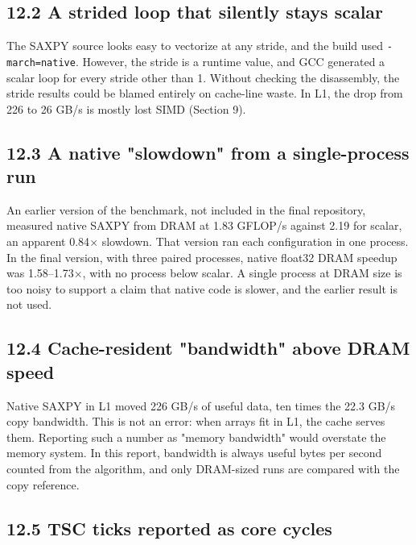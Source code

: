 \documentclass[10pt,letterpaper]{article}
\begin{document}
\subsection*{12.2 A strided loop that silently stays scalar}

The SAXPY source looks easy to vectorize at any stride, and the build used \texttt{-march=native}. However, the stride is a runtime value, and GCC generated a scalar loop for every stride other than 1. Without checking the disassembly, the stride results could be blamed entirely on cache-line waste. In L1, the drop from 226 to 26 GB/s is mostly lost SIMD (Section 9).


\subsection*{12.3 A native "slowdown" from a single-process run}

An earlier version of the benchmark, not included in the final repository, measured native SAXPY from DRAM at 1.83 GFLOP/s against 2.19 for scalar, an apparent 0.84$\times$ slowdown. That version ran each configuration in one process. In the final version, with three paired processes, native float32 DRAM speedup was 1.58--1.73$\times$, with no process below scalar. A single process at DRAM size is too noisy to support a claim that native code is slower, and the earlier result is not used.


\subsection*{12.4 Cache-resident "bandwidth" above DRAM speed}

Native SAXPY in L1 moved 226 GB/s of useful data, ten times the 22.3 GB/s copy bandwidth. This is not an error: when arrays fit in L1, the cache serves them. Reporting such a number as "memory bandwidth" would overstate the memory system. In this report, bandwidth is always useful bytes per second counted from the algorithm, and only DRAM-sized runs are compared with the copy reference.


\subsection*{12.5 TSC ticks reported as core cycles}
\end{document}

